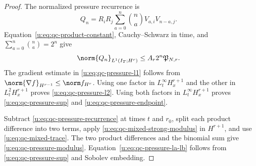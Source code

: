 \begin{proof}
The normalized pressure recurrence is
\begin{equation}
 Q_n=R_iR_j\sum_{a=0}^{n}\binom na V_{a,i}V_{n-a,j}.
 \label{u:eq:qc-pressure-recurrence}
\end{equation}
Equation~\eqref{u:eq:qc-product-constant}, Cauchy--Schwarz in time, and
\(\sum_{a=0}^n\binom na=2^n\) give
\begin{equation}
 \norm{Q_n}_{L^1(I_T;H^r)}
 \le A_r2^n\mathfrak P_{N,r}.
 \label{u:eq:qc-pressure-L1-sharp}
\end{equation}
The gradient estimate in \eqref{u:eq:qc-pressure-l1} follows from
\(\norm{\nabla f}_{H^{r-1}}\le\norm f_{H^r}\).
Using one factor in \(L_t^\infty H_x^{r+1}\) and the other in
\(L_t^2H_x^{r+1}\) proves \eqref{u:eq:qc-pressure-l2}.  Using both factors in
\(L_t^\infty H_x^{r+1}\) proves \eqref{u:eq:qc-pressure-sup} and
\eqref{u:eq:qc-pressure-endpoint}.

Subtract \eqref{u:eq:qc-pressure-recurrence} at times \(t\) and \(r_0\), split
each product difference into two terms, apply
\eqref{u:eq:qc-mixed-strong-modulus} in \(H^{r+1}\), and use
\eqref{u:eq:qc-mixed-trace}.  The two product differences and the binomial sum
give \eqref{u:eq:qc-pressure-modulus}.  Equation~\eqref{u:eq:qc-pressure-la-lb}
follows from \eqref{u:eq:qc-pressure-sup} and Sobolev embedding.
\end{proof}

